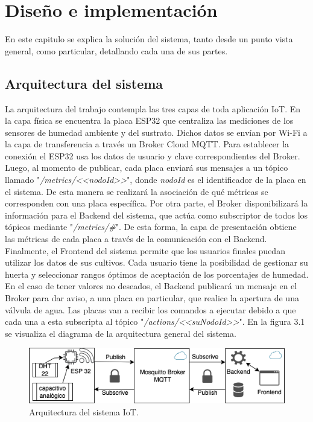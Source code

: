 \chapter{Diseño e implementación} %
En este capitulo se explica la solución del sistema, tanto desde un punto vista general, como particular, detallando cada una de sus partes.

\section{Arquitectura del sistema}
La arquitectura del trabajo contempla las tres capas de toda aplicación IoT. En la capa física se encuentra la placa ESP32 que centraliza las mediciones de los sensores de humedad ambiente y del sustrato. Dichos datos se envían por Wi-Fi a la capa de transferencia a través un Broker Cloud MQTT. Para establecer la conexión el ESP32 usa los datos de usuario y clave correspondientes del Broker. Luego, al momento de publicar, cada placa enviará sus mensajes a un tópico llamado "\textit{/metrics/<<nodoId>>}", donde \textit{nodoId} es el identificador de la placa en el sistema. De esta manera se realizará la asociación de qué métricas se corresponden con una placa específica. Por otra parte, el Broker disponibilizará la información para el Backend del sistema, que actúa como subscriptor de todos los tópicos mediante "\textit{/metrics/\#}". De esta forma, la capa de presentación obtiene las métricas de cada placa a través de la comunicación con el Backend. Finalmente, el Frontend del sistema permite que los usuarios finales puedan utilizar los datos de sus cultivos. Cada usuario tiene la posibilidad de gestionar su huerta y seleccionar rangos óptimos de aceptación de los porcentajes de humedad. En el caso de tener valores no deseados, el Backend publicará un mensaje en el Broker para dar aviso, a una placa en particular, que realice la apertura de una válvula de agua. Las placas van a recibir los comandos a ejecutar debido a que cada una a esta subscripta al tópico "\textit{/actions/<<suNodoId>>}". En la figura 3.1 se visualiza el diagrama de la arquitectura general del sistema.\\

\begin{figure}[htpb]
\centering 
\includegraphics[width=.9\textwidth]{./Figures/arqIoT.png}
\caption{Arquitectura del sistema IoT.}
\label{fig:diagBloques}
\end{figure}


